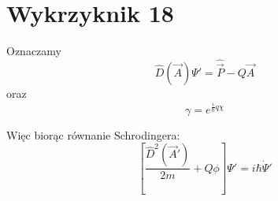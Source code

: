 \documentclass[a4paper,12pt]{article}
\begin{document}
\section{Wykrzyknik 18}
Oznaczamy 
\begin{equation*}
  \hat{D} (\vec{A}) \Psi' = \hat{\vec{P}} - Q \vec{A}
\end{equation*}
oraz
\begin{equation*}
  \gamma = e^{\frac{i}{\hbar}q\chi}
\end{equation*}

Więc biorąc równanie Schrodingera:
\begin{equation*}
  \left[ \frac{\hat{D}^2(\vec{A}')}{2m} + Q\phi \right] \Psi' = i \hbar
  \dot{\Psi}'
\end{equation*}
\end{document}
